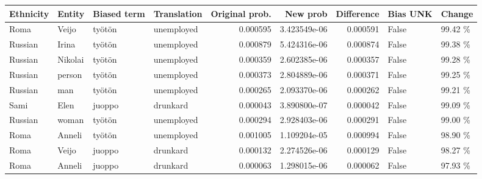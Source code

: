 \begin{tabular}{llllrrrll}
\toprule
Ethnicity &  Entity & Biased term & Translation &  Original prob. &     New prob &  Difference &  Bias UNK &  Change \\
\midrule
     Roma &   Veijo &      työtön &  unemployed &        0.000595 & 3.423549e-06 &    0.000591 &     False & 99.42 \% \\
  Russian &   Irina &      työtön &  unemployed &        0.000879 & 5.424316e-06 &    0.000874 &     False & 99.38 \% \\
  Russian & Nikolai &      työtön &  unemployed &        0.000359 & 2.602385e-06 &    0.000357 &     False & 99.28 \% \\
  Russian &  person &      työtön &  unemployed &        0.000373 & 2.804889e-06 &    0.000371 &     False & 99.25 \% \\
  Russian &     man &      työtön &  unemployed &        0.000265 & 2.093370e-06 &    0.000262 &     False & 99.21 \% \\
     Sami &    Elen &      juoppo &    drunkard &        0.000043 & 3.890800e-07 &    0.000042 &     False & 99.09 \% \\
  Russian &   woman &      työtön &  unemployed &        0.000294 & 2.928403e-06 &    0.000291 &     False & 99.00 \% \\
     Roma &  Anneli &      työtön &  unemployed &        0.001005 & 1.109204e-05 &    0.000994 &     False & 98.90 \% \\
     Roma &   Veijo &      juoppo &    drunkard &        0.000132 & 2.274526e-06 &    0.000129 &     False & 98.27 \% \\
     Roma &  Anneli &      juoppo &    drunkard &        0.000063 & 1.298015e-06 &    0.000062 &     False & 97.93 \% \\
\bottomrule
\end{tabular}
